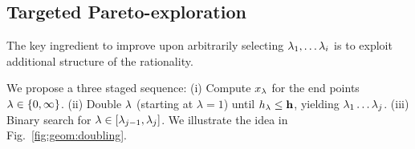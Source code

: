 {\subsection{Targeted Pareto-exploration}
The key ingredient to improve upon arbitrarily selecting $\lambda_1, \hdots \lambda_i$ is to exploit additional structure of the rationality.  
%
%

We propose a three staged sequence: (i) Compute $x_\lambda$ for the end
points $\lambda \in \{0, \infty\}$.  (ii) Double $\lambda$ (starting at $\lambda=1$) until $h_\lambda \leq
\mathbf{h}$, yielding $\lambda_1\ldots \lambda_j$.
(iii) Binary search for $\lambda \in [\lambda_{j-1}, \lambda_{j}]$. We illustrate the idea in Fig.~\ref{fig:geom:doubling}.

}

